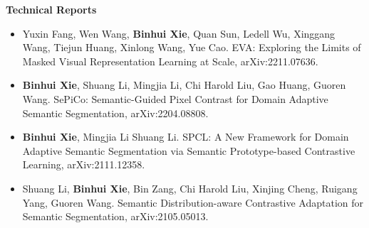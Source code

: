 \documentclass[letterpaper,11pt]{article}
\makeatletter
\newcommand{\resumeItem}[2]{
  \item\small{
    \textbf{#1}{: #2 \vspace{-2pt}}
  }
}
\newcommand{\resumeSubheading}[4]{
  \vspace{-1pt}\item
    \begin{tabular*}{0.97\textwidth}{l@{\extracolsep{\fill}}r}
      \textbf{#1} & #2 \\
      \textit{\small#3} & \textit{\small #4} \\
    \end{tabular*}\vspace{-5pt}
}
\newcommand{\resumeSubHeadingListStart}{\begin{itemize}[leftmargin=*]}
\newcommand{\resumeSubHeadingListEnd}{\end{itemize}}
\newcommand{\resumeItemListStart}{\begin{itemize}}
\newcommand{\resumeItemListEnd}{\end{itemize}\vspace{-5pt}}
\makeatother
\begin{document}
\textbf{Technical Reports}
\begin{itemize}
    \item Yuxin Fang, Wen Wang, \textbf{Binhui Xie}, Quan Sun, Ledell Wu, Xinggang Wang, Tiejun Huang, Xinlong Wang, Yue Cao. EVA: Exploring the Limits of Masked Visual Representation Learning at Scale, arXiv:2211.07636.
    \item \textbf{Binhui Xie}, Shuang Li, Mingjia Li, Chi Harold Liu, Gao Huang, Guoren Wang. 
    SePiCo: Semantic-Guided Pixel Contrast for Domain Adaptive Semantic Segmentation, arXiv:2204.08808.
    \item \textbf{Binhui Xie}, Mingjia Li Shuang Li. 
    SPCL: A New Framework for Domain Adaptive Semantic Segmentation via Semantic Prototype-based Contrastive Learning, arXiv:2111.12358.
    \item Shuang Li, \textbf{Binhui Xie}, Bin Zang, Chi Harold Liu, Xinjing Cheng, Ruigang Yang, Guoren Wang. 
    Semantic Distribution-aware Contrastive Adaptation for Semantic Segmentation, arXiv:2105.05013. 
\end{itemize}




\end{document}
